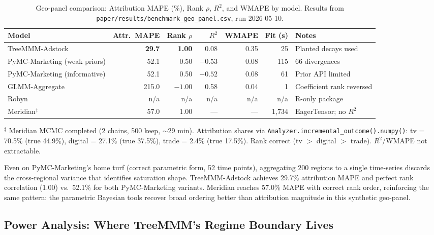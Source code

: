 \documentclass[review,12pt]{elsarticle}
\begin{document}
\begin{table}
\centering
\small
\caption{Geo-panel comparison: Attribution MAPE (\%), Rank $\rho$, $R^2$, and WMAPE
         by model. Results from \texttt{paper/results/benchmark\_geo\_panel.csv},
         run 2026-05-10.}
\label{tab:geo_results}
\begin{tabular}{@{}lrrrrrl@{}}
\toprule
Model & Attr.\ MAPE & Rank $\rho$ & $R^2$ & WMAPE & Fit (s) & Notes \\
\midrule
TreeMMM-Adstock                   & \textbf{29.7} & \textbf{1.00} & 0.08 & 0.35 & 25  & Planted decays used \\
PyMC-Marketing (weak priors)      & 52.1  & 0.50 & $-0.53$ & 0.08 & 115 & 66 divergences \\
PyMC-Marketing (informative)      & 52.1  & 0.50 & $-0.52$ & 0.08 & 61  & Prior API limited \\
GLMM-Aggregate                    & 215.0 & $-1.00$ & 0.58 & 0.04 & 1  & Coefficient rank reversed \\
Robyn & n/a & n/a & n/a & n/a & n/a & R-only package \\
Meridian$^\ddagger$               & 57.0  & 1.00 & --- & --- & 1,734 & EagerTensor; no $R^2$ \\
\bottomrule
\end{tabular}
\medskip
\small$^\ddagger$ Meridian MCMC completed (2 chains, 500 keep, $\sim$29 min).
Attribution shares via \texttt{Analyzer.incremental\_outcome().numpy()}:
tv = 70.5\% (true 44.9\%), digital = 27.1\% (true 37.5\%), trade = 2.4\% (true 17.5\%).
Rank correct (tv $>$ digital $>$ trade). $R^2$/WMAPE not extractable.
\end{table}

Even on PyMC-Marketing's home turf (correct parametric form, 52 time points),
aggregating 200 regions to a single time-series discards the cross-regional
variance that identifies saturation shape. TreeMMM-Adstock achieves 29.7\%
attribution MAPE and perfect rank correlation (1.00) vs.\ 52.1\% for both
PyMC-Marketing variants. Meridian reaches 57.0\% MAPE with correct rank order,
reinforcing the same pattern: the parametric Bayesian tools recover broad
ordering better than attribution magnitude in this synthetic geo-panel.

\subsection{Power Analysis: Where TreeMMM's Regime Boundary Lives}
\label{sec:results:power}
\end{document}
